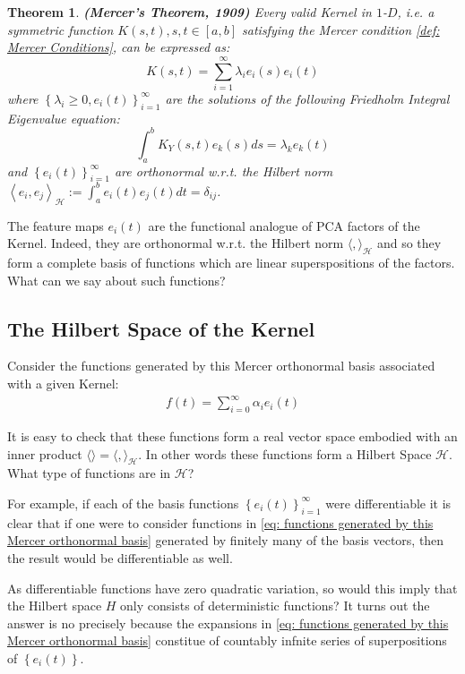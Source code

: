 \documentclass[11pt]{article}
\theoremstyle{plain} %
\newtheorem{theorem}{Theorem}[section]
\theoremstyle{remark}
\begin{document}
\begin{theorem}\textbf{(Mercer's Theorem, 1909)}
  Every valid Kernel in $1$-$D$, i.e. a symmetric function $K(s, t), s, t \in[a, b]$ satisfying the Mercer condition \cref{def: Mercer Conditions}, can be expressed
  as:
  $$
    K(s, t)=\sum_{i=1}^{\infty} \lambda_{i} e_{i}(s) e_{i}(t)
  $$
  where $\left\{\lambda_{i} \geq 0, e_{i}(t)\right\}_{i=1}^{\infty}$ are the
  solutions of the following Friedholm Integral Eigenvalue equation:
  $$
    \int_{a}^{b} K_{Y}(s, t) e_{k}(s) d s=\lambda_{k} e_{k}(t)
  $$
  and $\left\{e_{i}(t)\right\}_{i=1}^{\infty}$ are orthonormal w.r.t. the Hilbert
  norm $\left\langle e_{i}, e_{j}\right\rangle_{\mathcal{H}}:=\int_{a}^{b} e_{i}(t)
    e_{j}(t) d t=\delta_{i j}$.
\end{theorem}

The feature maps $e_{i}(t)$ are the functional analogue of PCA factors of the
Kernel. Indeed, they are orthonormal w.r.t. the Hilbert norm
$\langle,\rangle_{\mathcal{H}}$ and so they form a complete basis of functions
which are linear superspositions of the factors. What can we say about such
functions?
\subsection{The Hilbert Space of the Kernel}
Consider the functions generated by this Mercer orthonormal basis associated
with a given Kernel:
\begin{align}
  f(t)=\sum_{i=0}^{\infty} \alpha_{i} e_{i}(t)
  \label{eq: functions generated by this Mercer orthonormal basis}
\end{align}
  
It is easy to check that these functions form a real vector space embodied with
an inner product $\langle\rangle=\langle,\rangle_{\mathcal{H}}$. In other words
these functions form a Hilbert Space $\mathcal{H}$. What type of functions are in $\mathcal{H}$?

For example, if each of the basis functions
$\left\{e_{i}(t)\right\}_{i=1}^{\infty}$ were differentiable it is clear that if
one were to consider functions in \cref{eq: functions generated by this Mercer orthonormal basis} generated by finitely many of the basis
vectors, then the result would be differentiable as well.

As differentiable functions have zero quadratic variation, so would this imply
that the Hilbert space $H$ only consists of deterministic functions? It turns
out the answer is no precisely because the expansions in \cref{eq: functions generated by this Mercer orthonormal basis} constitue of
countably infnite series of superpositions of $\left\{e_{i}(t)\right\}$.
\end{document}

